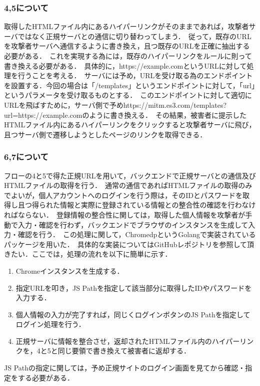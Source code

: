 \documentclass[dvipdfmx]{jsarticle}
\begin{document}
    \subsubsection{4,5について}
    取得したHTMLファイル内にあるハイパーリンクがそのままであれば，攻撃者サーバではなく正規サーバとの通信に切り替わってしまう．\
    従って，既存のURLを攻撃者サーバへ通信するように書き換え，且つ既存のURLを正確に抽出する必要がある．\
    これを実現する為には，既存のハイパーリンクをルールに則って書き換える必要がある．\
    具体的に，https://example.comというURLに対して処理を行うことを考える．\
    サーバには予め，URLを受け取る為のエンドポイントを設置する．今回の場合は「/templates」というエンドポイントに対して，「url」というパラメータを受け取るものとする．\
    このエンドポイントに対して適切にURLを飛ばすために，サーバ側で予めhttps://mitm.es3.com/templates?url=https://example.comのように書き換える．\
    その結果，被害者に提示したHTMLファイル内にあるハイパーリンクをクリックすると攻撃者サーバに飛び，且つサーバ側で遷移しようとしたページのリンクを取得できる．
    \subsubsection{6,7について}
    フローの4と5で得た正規URLを用いて，バックエンドで正規サーバとの通信及びHTMLファイルの取得を行う．\
    通常の通信であればHTMLファイルの取得のみでよいが，個人アカウントへのログインを行う際は，そのIDとパスワードを取得し且つ得られた情報と実際に登録されている情報との整合性の確認を行わなければならない．\
    登録情報の整合性に関しては，取得した個人情報を攻撃者が手動で入力・確認を行わず，バックエンドでブラウザのインスタンスを生成して入力・確認を行う．\
    この処理に関して，ChromedpというGolangで実装されているパッケージを用いた．\
    具体的な実装についてはGitHubレポジトリを参照して頂きたい．ここでは，処理の流れを以下に簡単に示す．
    \begin{enumerate}
        \item Chromeインスタンスを生成する．
        \item 指定URLを叩き，JS Pathを指定して該当部分に取得したIDやパスワードを入力する．
        \item 個人情報の入力が完了すれば，同じくログインボタンのJS Pathを指定してログイン処理を行う．
        \item 正規サーバに情報を整合させ，返却されたHTMLファイル内のハイパーリンクを，4と5と同じ要領で書き換えて被害者に返却する．
    \end{enumerate}
    JS Pathの指定に関しては，予め正規サイトのログイン画面を見てから確認・指定をする必要がある．
\end{document}
